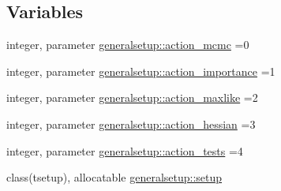 \subsection*{Variables}
\begin{DoxyCompactItemize}
\item 
integer, parameter \mbox{\hyperlink{namespacegeneralsetup_aa1fe7f09863579dea11fff2b498ea035}{generalsetup\+::action\+\_\+mcmc}} =0
\item 
integer, parameter \mbox{\hyperlink{namespacegeneralsetup_a8c2cc6dc22ec2b32558f1d3f478f835b}{generalsetup\+::action\+\_\+importance}} =1
\item 
integer, parameter \mbox{\hyperlink{namespacegeneralsetup_a7aa42a6a8502a7f927b5eef1f7c968b7}{generalsetup\+::action\+\_\+maxlike}} =2
\item 
integer, parameter \mbox{\hyperlink{namespacegeneralsetup_a4e469d33113eb48f19cfd83d113bab5c}{generalsetup\+::action\+\_\+hessian}} =3
\item 
integer, parameter \mbox{\hyperlink{namespacegeneralsetup_a6f10f3082af438a30e6188d4b75666de}{generalsetup\+::action\+\_\+tests}} =4
\item 
class(tsetup), allocatable \mbox{\hyperlink{namespacegeneralsetup_a9910f6f4ebbc88805bed3c999d7ce459}{generalsetup\+::setup}}
\end{DoxyCompactItemize}
